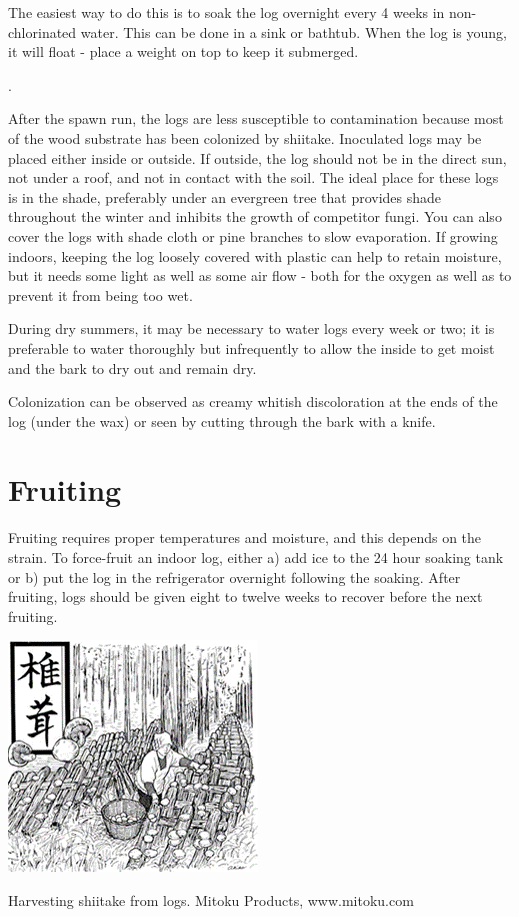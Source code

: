 \documentclass{tufte-handout}
\begin{document}
The easiest way to do this is to soak the log overnight every 4 weeks in non-chlorinated water. 
This can be done in a sink or bathtub.
When the log is young, it will float - place a weight on top to keep it submerged.


.

After the spawn run, the logs are less susceptible to contamination because most of the wood substrate has been colonized by shiitake.
Inoculated logs may be placed either inside or outside.
If outside, the log should not be in the direct sun, not under a roof, and not in contact with the soil.
The ideal place for these logs is in the shade, preferably under an evergreen tree that provides shade throughout the winter and inhibits the growth of competitor fungi.
You can also cover the logs with shade cloth or pine branches to slow evaporation.
If growing indoors, keeping the log loosely covered with plastic can help to retain moisture, but it needs some light as well as some air flow - both for the oxygen as well as to prevent it from being too wet.

During dry summers, it may be necessary to water logs every week or two; it is preferable to water thoroughly but infrequently to allow the inside to get moist and the bark to dry out and remain dry. 

Colonization can be observed as creamy whitish discoloration at the ends of the log (under the wax) or seen by cutting through the bark with a knife.

\section{Fruiting}

Fruiting requires proper temperatures and moisture, and this depends on the strain.
To force-fruit an indoor log, either a) add ice to the 24 hour soaking tank or b) put the log in the refrigerator overnight following the soaking.
After fruiting, logs should be given eight to twelve weeks to recover before the next fruiting. 

\begin{marginfigure}
\includegraphics{figures/shiitake-harvest}
\caption{Harvesting shiitake from logs. Mitoku Products, www.mitoku.com}
\end{marginfigure}
\end{document}
